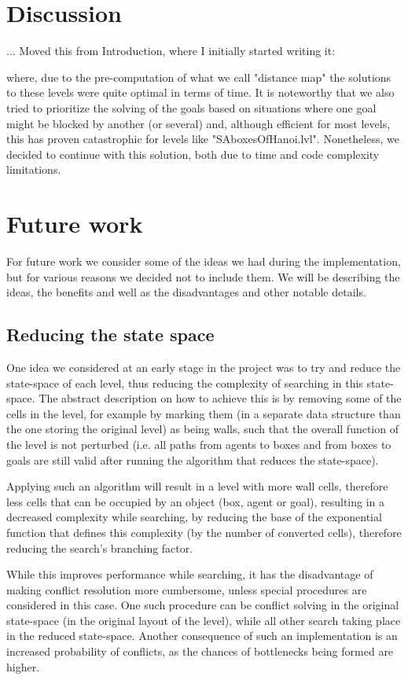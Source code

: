 \documentclass[letterpaper]{article}
\begin{document}
\section{Discussion}
... Moved this from Introduction, where I initially started writing it:

where, due to the pre-computation of what we call "distance map" the solutions to these levels were quite optimal in terms of time. It is noteworthy that we also tried to prioritize the solving of the goals based on situations where one goal might be blocked by another (or several) and, although efficient for most levels, this has proven catastrophic for levels like "SAboxesOfHanoi.lvl". Nonetheless, we decided to continue with this solution, both due to time and code complexity limitations.

\section{Future work}
For future work we consider some of the ideas we had during the implementation, but for various reasons we decided not to include them. We will be describing the ideas, the benefits and well as the disadvantages and other notable details.

\subsection{Reducing the state space}
One idea we considered at an early stage in the project was to try and reduce the state-space of each level, thus reducing the complexity of searching in this state-space. The abstract description on how to achieve this is by removing some of the cells in the level, for example by marking them (in a separate data structure than the one storing the original level) as being walls, such that the overall function of the level is not perturbed (i.e. all paths from agents to boxes and from boxes to goals are still valid after running the algorithm that reduces the state-space).

Applying such an algorithm will result in a level with more wall cells, therefore less cells that can be occupied by an object (box, agent or goal), resulting in a decreased complexity while searching, by reducing the base of the exponential function that defines this complexity (by the number of converted cells), therefore reducing the search's branching factor.

While this improves performance while searching, it has the disadvantage of making conflict resolution more cumbersome, unless special procedures are considered in this case. One such procedure can be conflict solving in the original state-space (in the original layout of the level), while all other search taking place in the reduced state-space. Another consequence of such an implementation is an increased probability of conflicts, as the chances of bottlenecks being formed are higher.
\end{document}
